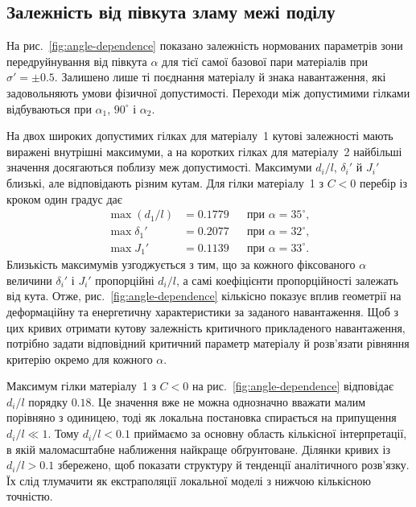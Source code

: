 \subsection{Залежність від півкута зламу межі поділу}
\label{subsec:figure3}

На рис.~\ref{fig:angle-dependence} показано залежність нормованих параметрів зони передруйнування від півкута $\alpha$ для тієї самої базової пари матеріалів при $\sigma'=\pm0.5$. Залишено лише ті поєднання матеріалу й знака навантаження, які задовольняють умови фізичної допустимості. Переходи між допустимими гілками відбуваються при
$\alpha_1$, $90^\circ$ і $\alpha_2$.


На двох широких допустимих гілках для матеріалу~1 кутові залежності мають виражені внутрішні максимуми, а на коротких гілках для матеріалу~2 найбільші значення досягаються поблизу меж допустимості. Максимуми $d_i/l$, $\delta_i'$ й $J_i'$ близькі, але відповідають різним кутам. Для гілки матеріалу~1 з $C<0$ перебір із кроком один градус дає
\begin{equation*}
\begin{aligned}
  \max(d_1/l)&=0.1779 &&\text{при }\alpha=35^\circ,\\
  \max\delta_1'&=0.2077 &&\text{при }\alpha=32^\circ,\\
  \max J_1'&=0.1139 &&\text{при }\alpha=33^\circ.
\end{aligned}
\end{equation*}
Близькість максимумів узгоджується з тим, що за кожного фіксованого $\alpha$ величини $\delta_i'$ і $J_i'$ пропорційні $d_i/l$, а самі коефіцієнти пропорційності залежать від кута. Отже, рис.~\ref{fig:angle-dependence} кількісно показує вплив геометрії на деформаційну та енергетичну характеристики за заданого навантаження. Щоб з цих кривих отримати кутову залежність критичного прикладеного навантаження, потрібно задати відповідний критичний параметр матеріалу й розв’язати рівняння критерію окремо для кожного $\alpha$.

Максимум гілки матеріалу~1 з $C<0$ на рис.~\ref{fig:angle-dependence} відповідає $d_i/l$ порядку $0.18$. Це значення вже не можна однозначно вважати малим порівняно з одиницею, тоді як локальна постановка спирається на припущення $d_i/l\ll1$. Тому $d_i/l<0.1$ приймаємо за основну область кількісної інтерпретації, в якій маломасштабне наближення найкраще обґрунтоване. Ділянки кривих із $d_i/l>0.1$ збережено, щоб показати структуру й тенденції аналітичного розв’язку. Їх слід тлумачити як екстраполяції локальної моделі з нижчою кількісною точністю.

